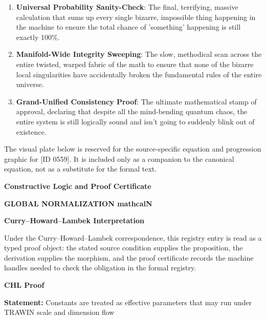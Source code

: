 \begin{enumerate}[leftmargin=1.6em,itemsep=6pt,topsep=4pt]
\item \textbf{Universal Probability Sanity-Check}: The final, terrifying, massive calculation that sums up every single bizarre, impossible thing happening in the machine to ensure the total chance of 'something' happening is still exactly 100\%.
\item \textbf{Manifold-Wide Integrity Sweeping}: The slow, methodical scan across the entire twisted, warped fabric of the math to ensure that none of the bizarre local singularities have accidentally broken the fundamental rules of the entire universe.
\item \textbf{Grand-Unified Consistency Proof}: The ultimate mathematical stamp of approval, declaring that despite all the mind-bending quantum chaos, the entire system is still logically sound and isn't going to suddenly blink out of existence.
\end{enumerate}

\begingroup\footnotesize\sloppy
The visual plate below is reserved for the source-specific equation and progression graphic for [ID 0559]. It is included only as a companion to the canonical equation, not as a substitute for the formal text.
\par\endgroup
\ifTZPDarkEdition
{}
\fi

\clearpage
\begingroup\tzpsupportsetup
\noindent\textbf{\fontsize{10.8pt}{12.8pt}\selectfont [ID 0559] Constructive Logic and Proof Certificate}\par
\noindent\textbf{\fontsize{10pt}{12pt}\selectfont GLOBAL NORMALIZATION mathcalN}\par
\vspace{0.45em}
\begingroup
\footnotesize
\setlength{\parskip}{0.22em}
\setlength{\parindent}{0pt}
\noindent\textbf{Curry--Howard--Lambek Interpretation}\par
Under the Curry--Howard--Lambek correspondence, this registry entry is read as a typed proof
object: the stated source condition supplies the proposition, the derivation supplies the
morphism, and the proof certificate records the machine handles needed to check the obligation
in the formal registry.

\vspace{0.45em}
\noindent\textbf{CHL Proof}\par
\textbf{Statement:} Constants are treated as effective parameters that may run under TRAWIN scale and
dimension flow

